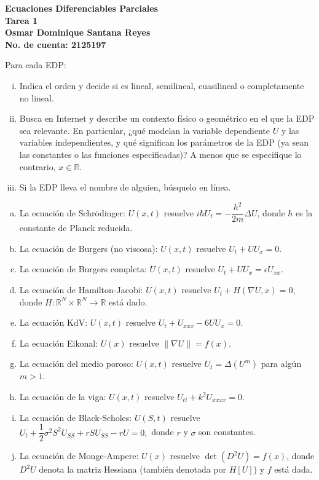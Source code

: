 \documentclass[fleqn]{article}
\newcommand{\real}{\mathbb{R}}
\begin{document}
	\textbf{Ecuaciones Diferenciables Parciales} \\
	\textbf{Tarea 1} \\
	\textbf{Osmar Dominique Santana Reyes} \\
	\textbf{No. de cuenta: 2125197}

	Para cada EDP:

	\begin{enumerate}[(i)]
		\item Indica el orden y decide si es lineal, semilineal, cuasilineal o completamente no lineal.
		\item Busca en Internet y describe un contexto físico o geométrico en el que la EDP sea relevante. En particular, ¿qué modelan la variable dependiente $ U $ y las variables independientes, y qué significan los parámetros de la EDP (ya sean las constantes o las funciones especificadas)? A menos que se especifique lo contrario, $ x \in \real $.
		\item Si la EDP lleva el nombre de alguien, búsquelo en línea.
	\end{enumerate}

	\begin{enumerate}[(a)]
		\item La ecuación de Schr\"odinger: $ U(x,t) $ resuelve $ i \hbar U_t = - \dfrac{h^2}{2m} \Delta U $, donde $ \hbar $ es la constante de Planck reducida.
		\item La ecuación de Burgers (no viscosa): $ U(x,t) $ resuelve $ U_t + U U_x = 0 $.
		\item La ecuación de Burgers completa: $ U(x,t) $ resuelve $ U_t + U U_x = \epsilon U_{xx} $.
		\item La ecuación de Hamilton-Jacobi: $ U(x,t) $ resuelve $ U_t + H(\nabla U, x) = 0 $, donde $ H \colon \real^N \times \real^N \to \real $ está dado.
		\item La ecuación KdV: $ U(x,t) $ resuelve $ U_t + U_{xxx} - 6UU_x = 0 $.
		\item La ecuación Eikonal: $ U(x) $ resuelve $ \lVert \nabla U \rVert = f(x) $.
		\item La ecuación del medio poroso: $ U(x,t) $ resuelve $ U_t = \Delta (U^m) $ para algún $ m > 1 $.
		\item La ecuación de la viga: $ U(x,t) $ resuelve $ U_{tt} + k^2 U_{xxxx} = 0 $.
		\item La ecuación de Black-Scholes: $ U(S,t) $ resuelve $ U_t + \dfrac{1}{2} \sigma^2 S^2 U_{SS} + rS U_{SS} - rU = 0, $ donde $ r $ y $ \sigma $ son constantes.
		\item La ecuación de Monge-Ampere: $ U(x) $ resuelve $ \det(D^2 U) = f(x) $, donde $ D^2 U $ denota la matriz Hessiana (también denotada por $ H[U] $) y $ f $ está dada.
	\end{enumerate}
\end{document}
